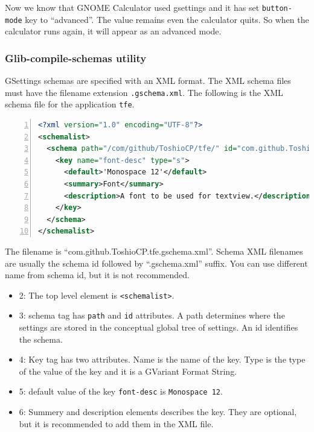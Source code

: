 Now we know that GNOME Calculator used gsettings and it has set
\passthrough{\lstinline!button-mode!} key to ``advanced''. The value
remains even the calculator quits. So when the calculator runs again, it
will appear as an advanced mode.

\subsubsection{Glib-compile-schemas
utility}\label{glib-compile-schemas-utility}

GSettings schemas are specified with an XML format. The XML schema files
must have the filename extension \passthrough{\lstinline!.gschema.xml!}.
The following is the XML schema file for the application
\passthrough{\lstinline!tfe!}.

\begin{lstlisting}[language=XML, numbers=left]
<?xml version="1.0" encoding="UTF-8"?>
<schemalist>
  <schema path="/com/github/ToshioCP/tfe/" id="com.github.ToshioCP.tfe">
    <key name="font-desc" type="s">
      <default>'Monospace 12'</default>
      <summary>Font</summary>
      <description>A font to be used for textview.</description>
    </key>
  </schema>
</schemalist>
\end{lstlisting}

The filename is ``com.github.ToshioCP.tfe.gschema.xml''. Schema XML
filenames are usually the schema id followed by ``.gschema.xml'' suffix.
You can use different name from schema id, but it is not recommended.

\begin{itemize}
\tightlist
\item
  2: The top level element is \passthrough{\lstinline!<schemalist>!}.
\item
  3: schema tag has \passthrough{\lstinline!path!} and
  \passthrough{\lstinline!id!} attributes. A path determines where the
  settings are stored in the conceptual global tree of settings. An id
  identifies the schema.
\item
  4: Key tag has two attributes. Name is the name of the key. Type is
  the type of the value of the key and it is a GVariant Format String.
\item
  5: default value of the key \passthrough{\lstinline!font-desc!} is
  \passthrough{\lstinline!Monospace 12!}.
\item
  6: Summery and description elements describes the key. They are
  optional, but it is recommended to add them in the XML file.
\end{itemize}

